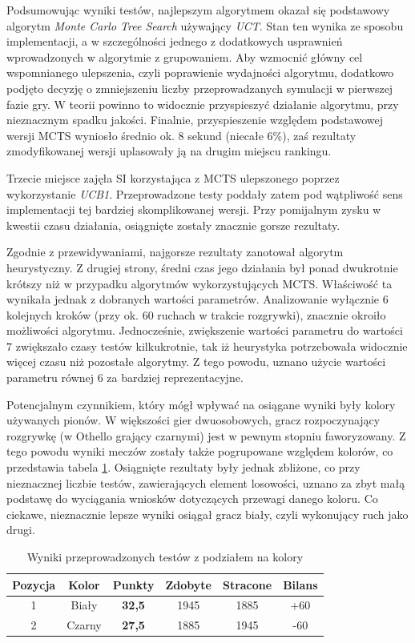 \documentclass[10pt]{article}
\begin{document}
Podsumowując wyniki testów, najlepszym algorytmem okazał się podstawowy algorytm \textit{Monte Carlo Tree Search} używający \textit{UCT}. Stan ten wynika ze sposobu implementacji, a w szczególności jednego z dodatkowych usprawnień wprowadzonych w algorytmie z grupowaniem. Aby wzmocnić główny cel wspomnianego ulepszenia, czyli poprawienie wydajności algorytmu, dodatkowo podjęto decyzję o zmniejszeniu liczby przeprowadzanych symulacji w pierwszej fazie gry. W teorii powinno to widocznie przyspieszyć działanie algorytmu, przy nieznacznym spadku jakości. Finalnie, przyspieszenie względem podstawowej wersji MCTS wyniosło średnio ok. 8 sekund (niecałe $6\%$), zaś rezultaty zmodyfikowanej wersji uplasowały ją na drugim miejscu rankingu.

Trzecie miejsce zajęła SI korzystająca z MCTS ulepszonego poprzez wykorzystanie \textit{UCB1}. Przeprowadzone testy poddały zatem pod wątpliwość sens implementacji tej bardziej skomplikowanej wersji. Przy pomijalnym zysku w kwestii czasu działania, osiągnięte zostały znacznie gorsze rezultaty.

Zgodnie z przewidywaniami, najgorsze rezultaty zanotował algorytm heurystyczny. Z drugiej strony, średni czas jego działania był ponad dwukrotnie krótszy niż w przypadku algorytmów wykorzystujących MCTS. Właściwość ta wynikała jednak z dobranych wartości parametrów. Analizowanie wyłącznie $6$ kolejnych kroków (przy ok. 60 ruchach w trakcie rozgrywki), znacznie okroiło możliwości algorytmu. Jednocześnie, zwiększenie wartości parametru do wartości $7$ zwiększało czasy testów kilkukrotnie, tak iż heurystyka potrzebowała widocznie więcej czasu niż pozostałe algorytmy. Z tego powodu, uznano użycie wartości parametru równej $6$ za bardziej reprezentacyjne.

Potencjalnym czynnikiem, który mógł wpływać na osiągane wyniki były kolory używanych pionów. W większości gier dwuosobowych, gracz rozpoczynający rozgrywkę (w Othello grający czarnymi) jest w pewnym stopniu faworyzowany. Z tego powodu wyniki meczów zostały także pogrupowane względem kolorów, co przedstawia tabela \ref{tab:test1c}. Osiągnięte rezultaty były jednak zbliżone, co przy nieznacznej liczbie testów, zawierających element losowości, uznano za zbyt małą podstawę do wyciągania wniosków dotyczących przewagi danego koloru. Co ciekawe, nieznacznie lepsze wyniki osiągał gracz biały, czyli wykonujący ruch jako drugi.

\begin{table}[H]
\centering
\begin{tabularx}{0.55\textwidth}{c|c|c|c|c|c}
\hline
Pozycja & Kolor & Punkty & Zdobyte & Stracone & Bilans \\
\hline \hline
1 & Biały & \textbf{32,5} & 1945 & 1885 & +60 \\
2 & Czarny & \textbf{27,5} & 1885 & 1945 & -60 \\
\hline
\end{tabularx}
\caption{Wyniki przeprowadzonych testów z podziałem na kolory}
\label{tab:test1c}
\end{table}
\end{document}
